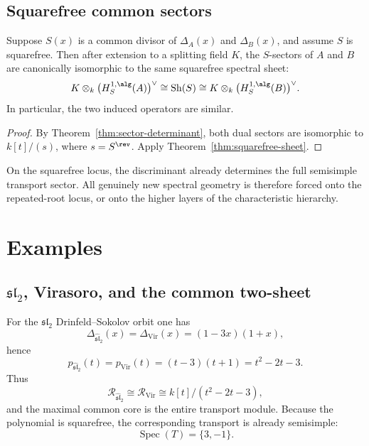 \subsection{Squarefree common sectors}

\begin{proposition}
\ClaimStatusProvedHere
\label{prop:squarefree-common-sector}
Suppose \(S(x)\) is a common divisor of \(\Delta_A(x)\) and \(\Delta_B(x)\), and assume \(S\) is squarefree.
Then after extension to a splitting field \(K\), the \(S\)-sectors of \(A\) and \(B\) are canonically isomorphic to the same squarefree spectral sheet:
\[
K\otimes_k \bigl(H^{1,\alg}_S(A)\bigr)^\vee
\cong \operatorname{Sh}(S)
\cong K\otimes_k \bigl(H^{1,\alg}_S(B)\bigr)^\vee.
\]
In particular, the two induced operators are similar.
\end{proposition}

\begin{proof}
By Theorem~\ref{thm:sector-determinant}, both dual sectors are isomorphic to \(k[t]/(s)\), where \(s=S^{\rev}\).
Apply Theorem~\ref{thm:squarefree-sheet}.
\end{proof}

\begin{remark}
On the squarefree locus, the discriminant already determines the full semisimple transport sector.
All genuinely new spectral geometry is therefore forced onto the repeated-root locus, or onto the higher layers of the characteristic hierarchy.
\end{remark}

\section{Examples}

\subsection{\(\mathfrak{sl}_2\), Virasoro, and the common two-sheet}

For the \(\mathfrak{sl}_2\) Drinfeld--Sokolov orbit one has
\[
\Delta_{\widehat{\mathfrak{sl}}_2}(x)
=
\Delta_{\mathrm{Vir}}(x)
=
(1-3x)(1+x),
\]
hence
\[
p_{\widehat{\mathfrak{sl}}_2}(t)=p_{\mathrm{Vir}}(t)=(t-3)(t+1)=t^2-2t-3.
\]
Thus
\[
\mathcal R_{\widehat{\mathfrak{sl}}_2}\cong \mathcal R_{\mathrm{Vir}}\cong k[t]/(t^2-2t-3),
\]
and the maximal common core is the entire transport module.
Because the polynomial is squarefree, the corresponding transport is already semisimple:
\[
\operatorname{Spec}(T)=\{3,-1\}.
\]

